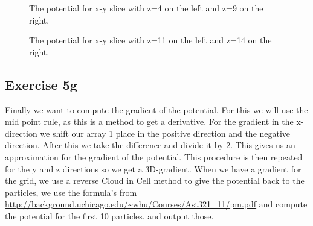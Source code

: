  \begin{figure}
    \centering
    \qquad
    \caption{The potential for x-y slice with z=4 on the left and z=9 on the right.}
  \end{figure}

 \begin{figure}
    \centering
    \qquad
    \caption{The potential for x-y slice with z=11 on the left and z=14 on the right.}
  \end{figure}
  
  \subsection{Exercise 5g}
  Finally we want to compute the gradient of the potential. For this we will use the mid point rule, as this is a method to get a derivative. For the gradient in the x-direction we shift our array 1 place in the positive direction and the negative direction. After this we take the difference and divide it by 2. This gives us an approximation for the gradient of the potential. This procedure is then repeated for the y and z directions so we get a 3D-gradient. 
  When we have a gradient for the grid, we use a reverse Cloud in Cell method to give the potential back to the particles, we use the formula's from \url{http://background.uchicago.edu/~whu/Courses/Ast321_11/pm.pdf} and compute the potential for the first 10 particles. and output those.
  
  
  